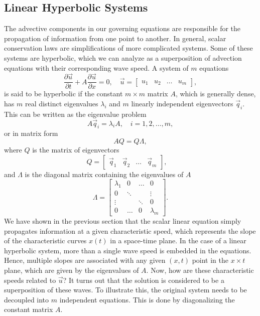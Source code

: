 \subsection{Linear Hyperbolic Systems}
\label{sec:linear_hyper_systems}
The advective components in our governing equations are responsible for the propagation of information from one point to another. In general, scalar conservation laws are simplifications of more complicated systems. Some of these systems are hyperbolic, which we can analyze as a superposition of advection equations with their corresponding wave speed. A system of $m$ equations
\begin{equation}
\frac{\partial \vec u}{\partial t} + A \frac{\partial \vec u}{\partial x} = 0,\quad \vec u = \begin{bmatrix} u_1 & u_2 & \ldots & u_m\end{bmatrix},
\label{eq:hyperprob_linearsystem}
\end{equation}
is said to be hyperbolic if the constant $m\times m$ matrix $A$, which is generally dense, has $m$ real distinct eigenvalues $\lambda_i$ and $m$ linearly independent eigenvectors $\vec q_i$. This can be written as the eigenvalue problem
\begin{equation}
	A \vec q_i = \lambda_i A,\quad i=1,2,\ldots,m,
\end{equation}
or in matrix form
\begin{equation}
	A Q = Q \Lambda,
	\label{eq:hyperprob_eigen}
\end{equation}
where $Q$ is the matrix of eigenvectors
\begin{equation}
	Q = 
	\begin{bmatrix}
		\vec q_1 & \vec q_2 & \ldots & \vec q_m
	\end{bmatrix}, \quad
\end{equation}
and $\Lambda$ is the diagonal matrix containing the eigenvalues of $A$
\begin{equation}
	\Lambda = 
	\begin{bmatrix}
		\lambda_1 	& 0			& \ldots  & 0 	   \\
		0	 		&  	\ddots  &         & \vdots \\
		\vdots 		&  		    & \ddots  & 0 \\
		0 			& \ldots	& 0		  & \lambda_m
	\end{bmatrix}.
\end{equation}
We have shown in the previous section that the scalar linear equation simply propagates information at a given characteristic speed, which represents the slope of the characteristic curves $x(t)$ in a space-time plane. In the case of a linear hyperbolic system, more than a single wave speed is embedded in the equations. Hence, multiple slopes are associated with any given $(x,t)$ point in the $x\times t$ plane, which are given by the eigenvalues of $A$. Now, how are these characteristic speeds related to $\vec u$? It turns out that the solution is considered to be a superposition of these waves. To illustrate this, the original system needs to be decoupled into $m$ independent equations. This is done by diagonalizing the constant matrix $A$.

